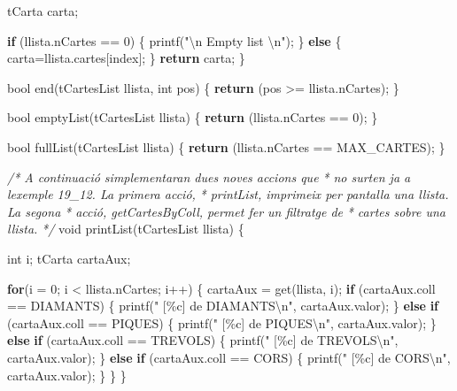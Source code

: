 \documentclass[
]{book}
\newenvironment{Shaded}{\begin{snugshade}}{\end{snugshade}}
\newcommand{\CommentTok}[1]{\textcolor[rgb]{0.56,0.35,0.01}{\textit{#1}}}
\newcommand{\ControlFlowTok}[1]{\textcolor[rgb]{0.13,0.29,0.53}{\textbf{#1}}}
\newcommand{\DataTypeTok}[1]{\textcolor[rgb]{0.13,0.29,0.53}{#1}}
\newcommand{\DecValTok}[1]{\textcolor[rgb]{0.00,0.00,0.81}{#1}}
\newcommand{\NormalTok}[1]{#1}
\newcommand{\SpecialCharTok}[1]{\textcolor[rgb]{0.00,0.00,0.00}{#1}}
\newcommand{\StringTok}[1]{\textcolor[rgb]{0.31,0.60,0.02}{#1}}
\begin{document}
\begin{Shaded}
\begin{Highlighting}[]
\NormalTok{    tCarta carta;}

    \ControlFlowTok{if}\NormalTok{ (llista.nCartes == }\DecValTok{0}\NormalTok{) \{}
\NormalTok{        printf(}\StringTok{"}\SpecialCharTok{\textbackslash{}n}\StringTok{ Empty list }\SpecialCharTok{\textbackslash{}n}\StringTok{"}\NormalTok{);}
\NormalTok{    \} }\ControlFlowTok{else}\NormalTok{ \{}
\NormalTok{        carta=llista.cartes[index];}
\NormalTok{    \}}
    \ControlFlowTok{return}\NormalTok{ carta;}
\NormalTok{\}}

\DataTypeTok{bool}\NormalTok{ end(tCartesList llista, }\DataTypeTok{int}\NormalTok{ pos) \{}
    \ControlFlowTok{return}\NormalTok{ (pos \textgreater{}= llista.nCartes);}
\NormalTok{\}}

\DataTypeTok{bool}\NormalTok{ emptyList(tCartesList llista) \{}
    \ControlFlowTok{return}\NormalTok{ (llista.nCartes == }\DecValTok{0}\NormalTok{);}
\NormalTok{\}}

\DataTypeTok{bool}\NormalTok{ fullList(tCartesList llista) \{}
    \ControlFlowTok{return}\NormalTok{ (llista.nCartes == MAX\_CARTES);}
\NormalTok{\}}

\CommentTok{/* A continuació s\textquotesingle{}implementaran dues noves accions que}
\CommentTok{ * no surten ja a l\textquotesingle{}exemple 19\_12. La primera acció, }
\CommentTok{ * printList, imprimeix per pantalla una llista. La segona}
\CommentTok{ * acció, getCartesByColl, permet fer un filtratge de }
\CommentTok{ * cartes sobre una llista. }
\CommentTok{ */}
\DataTypeTok{void}\NormalTok{ printList(tCartesList llista) \{}

    \DataTypeTok{int}\NormalTok{ i;}
\NormalTok{    tCarta cartaAux;}

    \ControlFlowTok{for}\NormalTok{(i = }\DecValTok{0}\NormalTok{; i \textless{} llista.nCartes; i++) \{ }
\NormalTok{        cartaAux = get(llista, i);}
        \ControlFlowTok{if}\NormalTok{ (cartaAux.coll == DIAMANTS) \{}
\NormalTok{            printf(}\StringTok{" [\%c] de DIAMANTS}\SpecialCharTok{\textbackslash{}n}\StringTok{"}\NormalTok{, cartaAux.valor);}
\NormalTok{        \} }\ControlFlowTok{else} \ControlFlowTok{if}\NormalTok{ (cartaAux.coll == PIQUES) \{}
\NormalTok{            printf(}\StringTok{" [\%c] de PIQUES}\SpecialCharTok{\textbackslash{}n}\StringTok{"}\NormalTok{, cartaAux.valor);}
\NormalTok{        \} }\ControlFlowTok{else} \ControlFlowTok{if}\NormalTok{ (cartaAux.coll == TREVOLS) \{}
\NormalTok{            printf(}\StringTok{" [\%c] de TREVOLS}\SpecialCharTok{\textbackslash{}n}\StringTok{"}\NormalTok{, cartaAux.valor);}
\NormalTok{        \} }\ControlFlowTok{else} \ControlFlowTok{if}\NormalTok{ (cartaAux.coll == CORS) \{}
\NormalTok{            printf(}\StringTok{" [\%c] de CORS}\SpecialCharTok{\textbackslash{}n}\StringTok{"}\NormalTok{, cartaAux.valor);}
\NormalTok{        \}}
\NormalTok{    \}}
\NormalTok{\}}


\end{Highlighting}
\end{Shaded}
\end{document}
